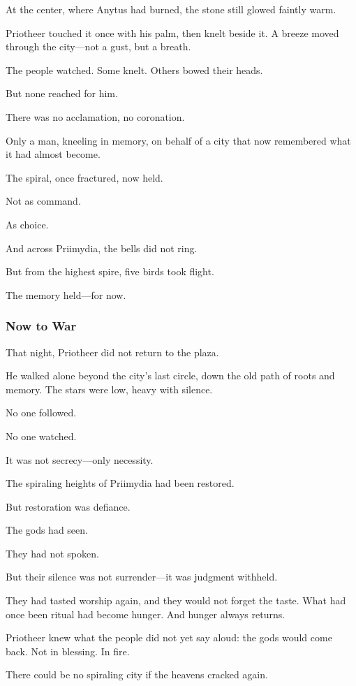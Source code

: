 \documentclass[12pt]{article}
\begin{document}
At the center, where Anytus had burned, the stone still glowed faintly warm. 

Priotheer touched it once with his palm, then knelt beside it. A breeze moved through the city—not a gust, but a breath.

The people watched. Some knelt. Others bowed their heads.

But none reached for him.

There was no acclamation, no coronation. 

Only a man, kneeling in memory, on behalf of a city that now remembered what it had almost become.

The spiral, once fractured, now held.

Not as command.

As choice.

And across Priimydia, the bells did not ring.

But from the highest spire, five birds took flight.

The memory held—for now.

\dotfill

\subsubsection*{Now to War}

That night, Priotheer did not return to the plaza.

He walked alone beyond the city’s last circle, down the old path of roots and memory. The stars were low, heavy with silence. 

No one followed.

No one watched. 

It was not secrecy—only necessity.

The spiraling heights of Priimydia had been restored. 

But restoration was defiance.

The gods had seen.

They had not spoken. 

But their silence was not surrender—it was judgment withheld. 

They had tasted worship again, and they would not forget the taste. What had once been ritual had become hunger. And hunger always returns.

Priotheer knew what the people did not yet say aloud: the gods would come back. Not in blessing. In fire.

There could be no spiraling city if the heavens cracked again. 
\end{document}
